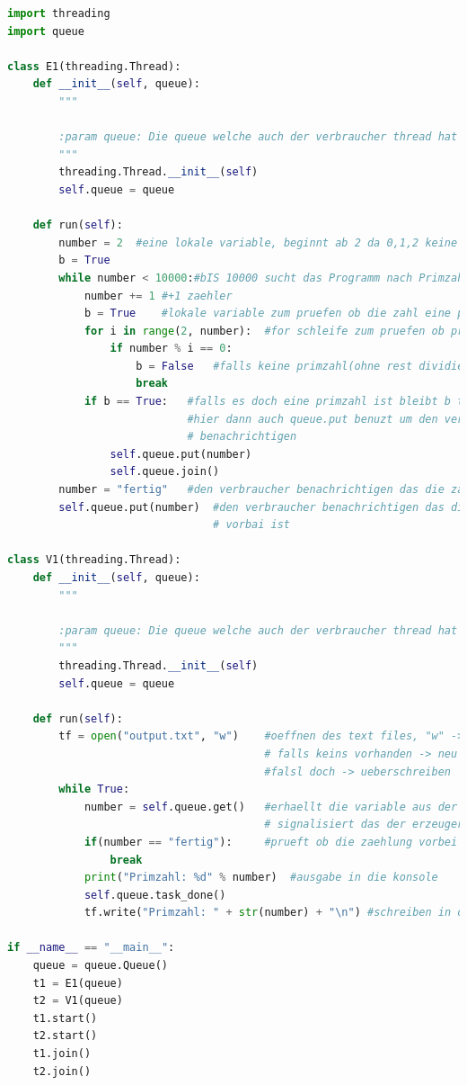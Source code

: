 \begin{lstlisting}[language=python]
import threading
import queue

class E1(threading.Thread):
    def __init__(self, queue):
        """

        :param queue: Die queue welche auch der verbraucher thread hat
        """
        threading.Thread.__init__(self)
        self.queue = queue

    def run(self):
        number = 2  #eine lokale variable, beginnt ab 2 da 0,1,2 keine Primzahlen sind
        b = True
        while number < 10000:#bIS 10000 sucht das Programm nach Primzahlen
            number += 1 #+1 zaehler
            b = True    #lokale variable zum pruefen ob die zahl eine prmzahl ist
            for i in range(2, number):  #for schleife zum pruefen ob primzahl
                if number % i == 0:
                    b = False   #falls keine primzahl(ohne rest dividierbar)
                    break
            if b == True:   #falls es doch eine primzahl ist bleibt b true und somit wird
                            #hier dann auch queue.put benuzt um den verbraucher zu
                            # benachrichtigen
                self.queue.put(number)
                self.queue.join()
        number = "fertig"   #den verbraucher benachrichtigen das die zaehlung vorbai ist
        self.queue.put(number)  #den verbraucher benachrichtigen das die zaehlung
                                # vorbai ist

class V1(threading.Thread):
    def __init__(self, queue):
        """

        :param queue: Die queue welche auch der verbraucher thread hat
        """
        threading.Thread.__init__(self)
        self.queue = queue

    def run(self):
        tf = open("output.txt", "w")    #oeffnen des text files, "w" ->
                                        # falls keins vorhanden -> neu erstellen
                                        #falsl doch -> ueberschreiben
        while True:
            number = self.queue.get()   #erhaellt die variable aus der queue und
                                        # signalisiert das der erzeuger weitermachen kann
            if(number == "fertig"):     #prueft ob die zaehlung vorbei ist
                break
            print("Primzahl: %d" % number)  #ausgabe in die konsole
            self.queue.task_done()
            tf.write("Primzahl: " + str(number) + "\n") #schreiben in das text file

if __name__ == "__main__":
    queue = queue.Queue()
    t1 = E1(queue)
    t2 = V1(queue)
    t1.start()
    t2.start()
    t1.join()
    t2.join()
\end{lstlisting}
\clearpage
